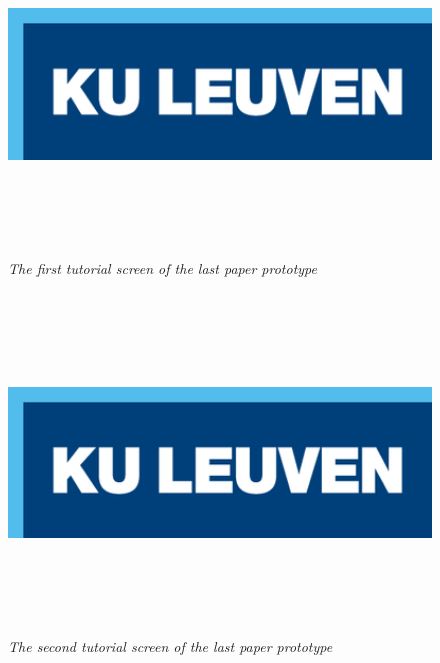 \begin{figure}[H]
	\begin{center}
		\includegraphics[width=16cm, height=9cm]{KUL.png}
		\caption{\emph{The first tutorial screen of the last paper prototype}}
		\label{The first tutorial screen of the last paper prototype}
	\end{center}
\end{figure}

\begin{figure}[H]
	\begin{center}
		\includegraphics[width=16cm, height=9cm]{KUL.png}
		\caption{\emph{The second tutorial screen of the last paper prototype}}
		\label{The second tutorial screen of the last paper prototype}
	\end{center}
\end{figure}


